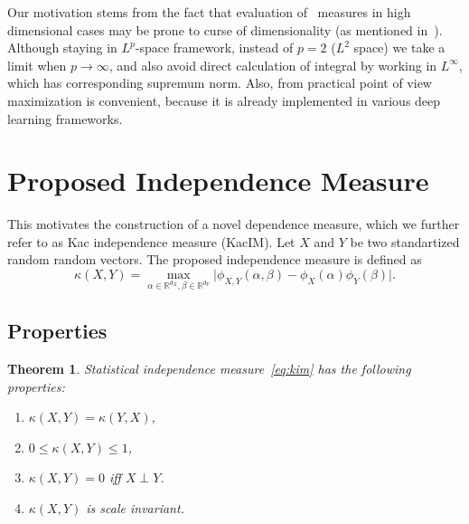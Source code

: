 \documentclass{article}
\newtheorem{theorem}{Theorem}
\begin{document}
Our motivation stems from the fact that evaluation of~\cite{Szekely} measures in high dimensional cases may be prone to curse of dimensionality (as mentioned in~\cite{Edlemann}). Although staying in $L^{p}$-space framework, instead of $p = 2$ ($L^{2}$ space) we take a limit when  $p \rightarrow \infty$, and also avoid direct calculation of integral by working in $L^{\infty}$, which has corresponding supremum norm. Also, from practical point of view maximization is convenient, because it is already implemented in various deep learning frameworks. %

\section{Proposed Independence Measure}
\label{section:proposed_method}



\noindent This motivates the construction of a novel dependence measure, which we further refer to as Kac independence measure (KacIM). Let $X$ and $Y$ be two standartized random random vectors. The proposed independence measure is defined as
\begin{equation}
\label{eq:kim}
    \kappa(X,Y) = \max_{\alpha \in \mathbb{R}^{d_{X}}, \beta \in \mathbb{R}^{d_{Y}}} \vert \phi_{X,Y}(\alpha, \beta)  -\phi_{X}(\alpha) \phi_{Y}(\beta) \vert.
\end{equation}


\subsection{Properties}
\begin{theorem}
\label{thm:properties}
  Statistical independence measure~\eqref{eq:kim} has the following properties:
  \begin{enumerate} 
    \item $\kappa(X,Y) = \kappa(Y,X)$,
    \item $0 \leq \kappa(X,Y) \leq 1$,
    \item $\kappa(X,Y) = 0$ iff $X\perp Y$.
    \item $\kappa(X,Y)$ is scale invariant.
   \end{enumerate}    
\end{theorem}
\end{document}
